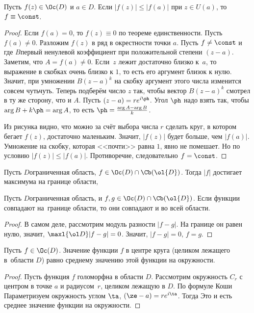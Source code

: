 \documentclass[a4paper]{article}
\begin{document}
\begin{theorem}
Пусть $f(z)\in\Oc(D)$ и $a \in D$. Если $|f(z)| \le |f(a)|$ при $z \in U(a)$, то $f \equiv \const$.
\end{theorem}
\begin{proof}
Если $f(a)=0$, то $f(z)\equiv 0$ по теореме единственности. Пусть $f(a) \neq 0$.
Разложим $f(z)$ в ряд в окрестности точки $a$. Пусть $f \neq \const$ и
где $B$\т первый ненулевой коэффициент при положительной степени $(z-a)$. Заметим, что $A = f(a) \neq 0$.
Если~$z$ лежит достаточно близко к~$a$, то выражение в скобках очень близко к $1$, то есть его аргумент близок к нулю.
Значит, при умножении $B(z-a)^k$ на скобку аргумент этого числа изменится совсем чуть\д чуть.
Теперь подберём число $z$ так, чтобы вектор $B(z-a)^k$ смотрел в ту же сторону, что и $A$.
Пусть $(z-a)=re^{i\ph}$. Угол $\ph$ надо взять так, чтобы $\arg B+k\ph=\arg A$, то есть $\ph = \frac{\arg A-\arg B}{k}$.

Из рисунка видно, что можно за счёт выбора числа $r$ сделать круг, в котором бегает $f(z)$, достаточно маленьким.
Значит, $|f(z)|$ будет больше, чем $|f(a)|$. Умножение на скобку, которая <<почти>> равна $1$, явно не помешает.
Но по условию $|f(z)| \le |f(a)|$. Противоречие, следовательно $f = \const$.
\end{proof}

\begin{imp}
Пусть $D$\т ограниченная область, $f \in \Oc(D) \cap \Cb(\ol{D})$. Тогда $|f|$ достигает максимума
на границе области, 
\end{imp}
\begin{imp}
Пусть $D$\т ограниченная область, и $f,g \in\Oc(D) \cap \Cb(\ol{D})$. Если функции совпадают на~границе области,
то они совпадают и во всей области.
\end{imp}
\begin{proof}
В самом деле, рассмотрим модуль разности $|f - g|$. На границе он равен нулю, значит, $\maxl{\ol D} |f-g| = 0$.
Значит, $|f-g|=0$,  $f=g$.
\end{proof}

\begin{theorem}[о среднем]
Пусть $f \in \Oc(D)$. Значение функции $f$ в центре круга (целиком лежащего в~области $D$) равно среднему значению
этой функции на окружности.
\end{theorem}
\begin{proof}
Пусть функция $f$ голоморфна в области $D$. Рассмотрим окружность $C_r$ с центром в точке $a$ и радиусом~$r$,
целиком лежащую в $D$. По формуле Коши
Параметризуем окружность углом $\ta$,  $(\ze - a) = r e^{i\ta}$. Тогда
Это и есть среднее значение функции на окружности.
\end{proof}
\end{document}
